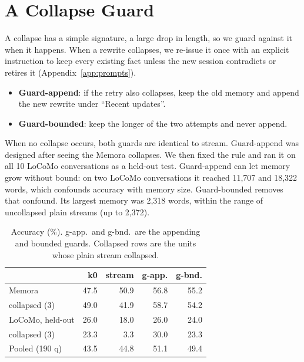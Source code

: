 \documentclass[11pt]{article}
\begin{document}
\section{A Collapse Guard}\label{sec:guard}
A collapse has a simple signature, a large drop in length, so we guard against it when it happens. When a rewrite collapses, we re-issue it once with an explicit instruction to keep every existing fact unless the new session contradicts or retires it (Appendix~\ref{app:prompts}).
\begin{itemize}
\item \textbf{Guard-append}: if the retry also collapses, keep the old memory and append the new rewrite under ``Recent updates''.
\item \textbf{Guard-bounded}: keep the longer of the two attempts and never append.
\end{itemize}
When no collapse occurs, both guards are identical to stream. Guard-append was designed after seeing the Memora collapses. We then fixed the rule and ran it on all 10 LoCoMo conversations as a held-out test. Guard-append can let memory grow without bound: on two LoCoMo conversations it reached 11,707 and 18,322 words, which confounds accuracy with memory size. Guard-bounded removes that confound. Its largest memory was 2,318 words, within the range of uncollapsed plain streams (up to 2,372).

\begin{table}[t]
\centering\small
\setlength{\tabcolsep}{4pt}
\begin{tabular}{lrrrr}
\toprule
 & k0 & stream & g-app. & g-bnd. \\
\midrule
Memora & 47.5 & 50.9 & 56.8 & 55.2 \\
\quad collapsed (3) & 49.0 & 41.9 & 58.7 & 54.2 \\
LoCoMo, held-out & 26.0 & 18.0 & 26.0 & 24.0 \\
\quad collapsed (3) & 23.3 & 3.3 & 30.0 & 23.3 \\
Pooled (190 q) & 43.5 & 44.8 & 51.1 & 49.4 \\
\bottomrule
\end{tabular}
\caption{Accuracy (\%). g-app.\ and g-bnd.\ are the appending and bounded guards. Collapsed rows are the units whose plain stream collapsed.}
\label{tab:main}
\end{table}
\end{document}
